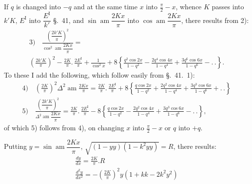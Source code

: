 \documentclass{article}
\begin{document}
If $q$ is changed into $-q$ and at the same time $x$ into $\frac{\pi}{2}-x$, whence $K$ passes into $k'K$, $E^{\mathrm{I}}$ into $\dfrac{E^{\mathrm{I}}}{k'}$ §.\ 41, and $\sin\operatorname{am}\dfrac{2Kx}{\pi}$ into $\cos\operatorname{am}\dfrac{2Kx}{\pi}$, there results from 2):
\[
\begin{gathered}
\text{3)}\quad\frac{\left(\dfrac{2k'K}{\pi}\right)^{2}}{\cos^{2}\operatorname{am}\dfrac{2Kx}{\pi}}=\\[1.5ex]
\left(\frac{2k'K}{\pi}\right)^{2}-\frac{2K}{\pi}.\,\frac{2E^{\mathrm{I}}}{\pi}+\frac{1}{\cos^{2}x}+8\left\{\frac{q^{2}\cos 2x}{1-q^{2}}-\frac{2q^{4}\cos 4x}{1-q^{4}}+\frac{3q^{6}\cos 6x}{1-q^{6}}-.\,.\right\}.
\end{gathered}
\]
To these I add the following, which follow easily from §.\ 41.\ 1):
\[
\begin{gathered}
\text{4)}\quad\left(\frac{2K}{\pi}\right)^{2}\Delta^{2}\operatorname{am}\frac{2Kx}{\pi}=\frac{2K}{\pi}.\,\frac{2E^{\mathrm{I}}}{\pi}+8\left\{\frac{q\cos 2x}{1-q^{2}}+\frac{2q^{2}\cos 4x}{1-q^{4}}+\frac{3q^{3}\cos 6x}{1-q^{6}}+.\,.\right\}\\[1.5ex]
\text{5)}\quad\frac{\left(\dfrac{2k'K}{\pi}\right)^{2}}{\Delta^{2}\operatorname{am}\dfrac{2Kx}{\pi}}=\frac{2K}{\pi}.\,\frac{2E^{\mathrm{I}}}{\pi}-8\left\{\frac{q\cos 2x}{1-q^{2}}-\frac{2q^{2}\cos 4x}{1-q^{4}}+\frac{3q^{3}\cos 6x}{1-q^{6}}-.\,.\right\},
\end{gathered}
\]
of which 5) follows from 4), on changing $x$ into $\frac{\pi}{2}-x$ or $q$ into $+q$.

Putting $y=\sin\operatorname{am}\dfrac{2Kx}{\pi}$, $\sqrt{(1-yy)(1-k^{2}yy)}=R$, there results:
\[
\begin{gathered}
\frac{dy}{dx}=\frac{2K}{\pi}.R\\[1.5ex]
\frac{d^{2}y}{dx^{2}}=-\left(\frac{2K}{\pi}\right)^{2}y(1+kk-2k^{2}y^{2})
\end{gathered}
\]
\end{document}
